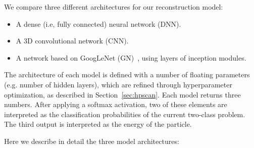 We compare three different architectures for our reconstruction model:

\begin{itemize}
\item A dense (i.e, fully connected) neural network (DNN).
\item A 3D convolutional network (CNN).
\item A network based on GoogLeNet (GN)~\cite{GoogLeNet}, using layers of inception modules.
\end{itemize}

The architecture of each model is defined with a number of floating parameters (e.g. number of hidden layers), which are refined through hyperparameter optimization, as described in Section~\ref{sec:hpscan}. Each model returns three numbers. After applying a softmax activation, two of these elements are interpreted as the classification probabilities of the current two-class problem. The third output is interpreted as the energy of the particle.

Here we describe in detail the three model architectures:

